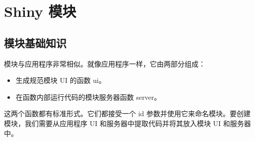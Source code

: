 \chapter{Shiny 模块\label{ch19}}
\section{模块基础知识}
模块与应用程序非常相似。就像应用程序一样，它由两部分组成：
\begin{itemize}
    \item 生成规范模块 UI 的函数 ui。
    \item 在函数内部运行代码的模块服务器函数 server。
\end{itemize}
这两个函数都有标准形式。它们都接受一个 id 参数并使用它来命名模块。要创建模块，我们需要从应用程序 UI 和服务器中提取代码并将其放入模块 UI 和服务器中。